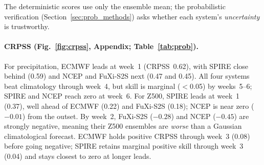 \documentclass[11pt,a4paper]{article}
\begin{document}
The deterministic scores use only the ensemble mean; the probabilistic
verification (Section~\ref{sec:prob_methods}) asks whether each system's
\emph{uncertainty} is trustworthy.

\paragraph{CRPSS (Fig.~\ref{fig:crpss}, Appendix; Table~\ref{tab:prob}).}
For precipitation, ECMWF leads at week~1 (CRPSS~0.62), with SPIRE
close behind (0.59) and NCEP and FuXi-S2S next (0.47 and 0.45). All
four systems beat climatology through week~4, but skill is marginal
($<$0.05) by weeks~5--6; SPIRE and NCEP reach zero at week~6.
For Z500, SPIRE leads at week~1 (0.37), well ahead of ECMWF (0.22)
and FuXi-S2S (0.18); NCEP is near zero ($-0.01$) from the outset.
By week~2, FuXi-S2S ($-0.28$) and NCEP ($-0.45$) are strongly
negative, meaning their Z500 ensembles are \emph{worse} than a
Gaussian climatological forecast. ECMWF holds positive CRPSS
through week~3 (0.08) before going negative; SPIRE retains marginal
positive skill through week~3 (0.04) and stays closest to zero
at longer leads.
\end{document}
